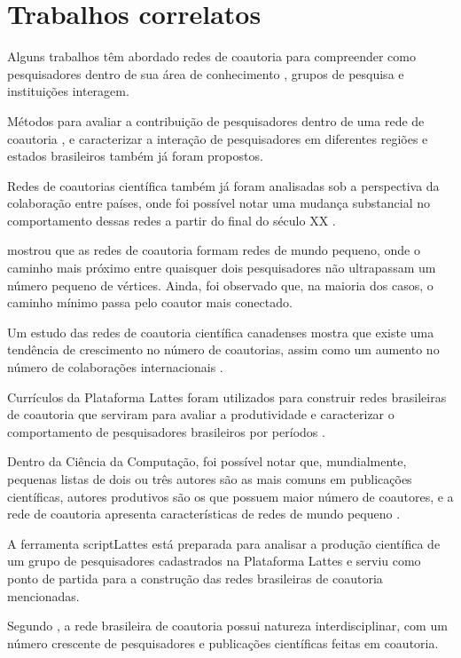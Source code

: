 \chapter[Trabalhos correlatos]{Trabalhos correlatos}

Alguns trabalhos têm abordado redes de coautoria para compreender como pesquisadores dentro de sua área de conhecimento \cite{mena2014brazilian} \cite{franceschet2011collaboration} \cite{santin2016collaboration}, grupos de pesquisa \cite{delgado2014analyzing} e instituições \cite{ioannidis2008measuring} interagem.

Métodos para avaliar a contribuição de pesquisadores dentro de uma rede de coautoria \cite{liu2005co} \cite{franceschet2011collaboration}, e caracterizar a interação de pesquisadores em diferentes regiões e estados brasileiros \cite{sidone2016ciencia} também já foram propostos.

Redes de coautorias científica também já foram analisadas sob a perspectiva da colaboração entre países, onde foi possível notar uma mudança substancial no comportamento dessas redes a partir do final do século XX \cite{glanzel2004analysing}.

 mostrou que as redes de coautoria formam redes de mundo pequeno, onde o caminho mais próximo entre quaisquer dois pesquisadores não ultrapassam um número pequeno de vértices. Ainda, foi observado que, na maioria dos casos, o caminho mínimo passa pelo coautor mais conectado.

Um estudo das redes de coautoria científica canadenses mostra que existe uma tendência de crescimento no número de coautorias, assim como um aumento no número de colaborações internacionais \cite{lariviere2006canadian}.

Currículos da Plataforma Lattes foram utilizados para construir redes brasileiras de coautoria que serviram para avaliar a produtividade e caracterizar o comportamento de pesquisadores brasileiros por períodos \cite{mena2014brazilian}.

Dentro da Ciência da Computação, foi possível notar que, mundialmente, pequenas listas de dois ou três autores são as mais comuns em publicações científicas, autores produtivos são os que possuem maior número de coautores, e a rede de coautoria apresenta características de redes de mundo pequeno \cite{franceschet2011collaboration}.

A ferramenta scriptLattes \cite{mena2009scriptlattes} está preparada para analisar a produção científica de um grupo de pesquisadores cadastrados na Plataforma Lattes \cite{mena2013prospecccao} e serviu como ponto de partida para a construção das redes brasileiras de coautoria mencionadas.

Segundo , a rede brasileira de coautoria possui natureza interdisciplinar, com um número crescente de pesquisadores e publicações científicas feitas em coautoria.
